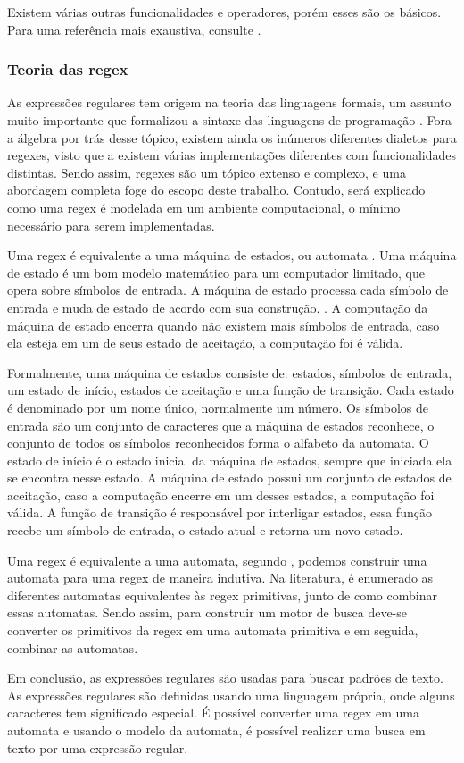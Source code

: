 Existem várias outras funcionalidades e operadores, porém esses são os básicos.
Para uma referência mais exaustiva, consulte \cite{mastering}.

\subsubsection{Teoria das regex}
As expressões regulares tem origem na teoria das linguagens formais, um assunto muito importante que formalizou a sintaxe das linguagens de programação \cite{theory-computation}.
Fora a álgebra por trás desse tópico, existem ainda os inúmeros diferentes dialetos para regexes, visto que a existem várias implementações diferentes com funcionalidades distintas.
Sendo assim, regexes são um tópico extenso e complexo, e uma abordagem completa foge do escopo deste trabalho.
Contudo, será explicado como uma regex é modelada em um ambiente computacional, o mínimo necessário para serem implementadas.

Uma regex é equivalente a uma máquina de estados, ou automata \cite{theory-computation}.
Uma máquina de estado é um bom modelo matemático para um computador limitado, que opera sobre símbolos de entrada.
A máquina de estado processa cada símbolo de entrada e muda de estado de acordo com sua construção. \cite{theory-computation}.
A computação da máquina de estado encerra quando não existem mais símbolos de entrada, caso ela esteja em um de seus estado de aceitação, a computação foi é válida.

Formalmente, uma máquina de estados consiste de: estados, símbolos de entrada, um estado de início, estados de aceitação e uma função de transição.
Cada estado é denominado por um nome único, normalmente um número.
Os símbolos de entrada são um conjunto de caracteres que a máquina de estados reconhece, o conjunto de todos os símbolos reconhecidos forma o alfabeto da automata.
O estado de início é o estado inicial da máquina de estados, sempre que iniciada ela se encontra nesse estado.
A máquina de estado possui um conjunto de estados de aceitação, caso a computação encerre em um desses estados, a computação foi válida.
A função de transição é responsável por interligar estados, essa função recebe um símbolo de entrada, o estado atual e retorna um novo estado. \cite{theory}

Uma regex é equivalente a uma automata, segundo \cite{dragon-book}, podemos construir uma automata para uma regex de maneira indutiva.
Na literatura, é enumerado as diferentes automatas equivalentes às regex primitivas, junto de como combinar essas automatas.
Sendo assim, para  construir um motor de busca deve-se converter os primitivos da regex em uma automata primitiva e em seguida, combinar as automatas.

Em conclusão, as expressões regulares são usadas para buscar padrões de texto.
As expressões regulares são definidas usando uma linguagem própria, onde alguns caracteres tem significado especial.
É possível converter uma regex em uma automata e usando o modelo da automata, é possível realizar uma busca em texto por uma expressão regular.
